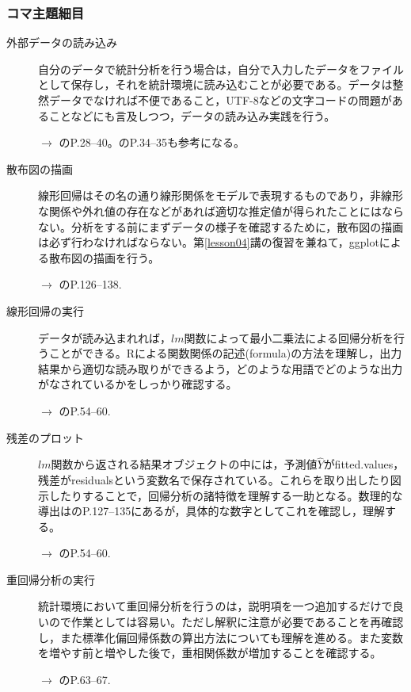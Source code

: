 \subsubsection{コマ主題細目}
\begin{description}
\item[外部データの読み込み]自分のデータで統計分析を行う場合は，自分で入力したデータをファイルとして保存し，それを統計環境に読み込むことが必要である。データは整然データでなければ不便であること，UTF-8などの文字コードの問題があることなどにも言及しつつ，データの読み込み実践を行う。
\begin{flushright}
    $\to$ \citet{紀ノ定201806}のP.28--40。\citet{kosugi2019}のP.34--35も参考になる。
\end{flushright}

\item[散布図の描画]線形回帰はその名の通り線形関係をモデルで表現するものであり，非線形な関係や外れ値の存在などがあれば適切な推定値が得られたことにはならない。分析をする前にまずデータの様子を確認するために，散布図の描画は必ず行わなければならない。第\ref{lesson04}講の復習を兼ねて，ggplotによる散布図の描画を行う。
\begin{flushright}
    $\to$ \citet{紀ノ定201806}のP.126--138.
\end{flushright}

\item[線形回帰の実行]データが読み込まれれば，$lm$関数によって最小二乗法による回帰分析を行うことができる。Rによる関数関係の記述(formula)の方法を理解し，出力結果から適切な読み取りができるよう，どのような用語でどのような出力がなされているかをしっかり確認する。
\begin{flushright}
    $\to$ \citet{kosugi2018}のP.54--60.
\end{flushright}

\item[残差のプロット]$lm$関数から返される結果オブジェクトの中には，予測値$\hat{Y}$がfitted.values，残差がresidualsという変数名で保存されている。これらを取り出したり図示したりすることで，回帰分析の諸特徴を理解する一助となる。数理的な導出は\citet{kosugi2018}のP.127--135にあるが，具体的な数字としてこれを確認し，理解する。
\begin{flushright}
    $\to$ \citet{kosugi2018}のP.54--60.
\end{flushright}

\item[重回帰分析の実行]統計環境において重回帰分析を行うのは，説明項を一つ追加するだけで良いので作業としては容易い。ただし解釈に注意が必要であることを再確認し，また標準化偏回帰係数の算出方法についても理解を進める。また変数を増やす前と増やした後で，重相関係数が増加することを確認する。
\begin{flushright}
    $\to$ \citet{kosugi2018}のP.63--67.
\end{flushright}

\end{description}
